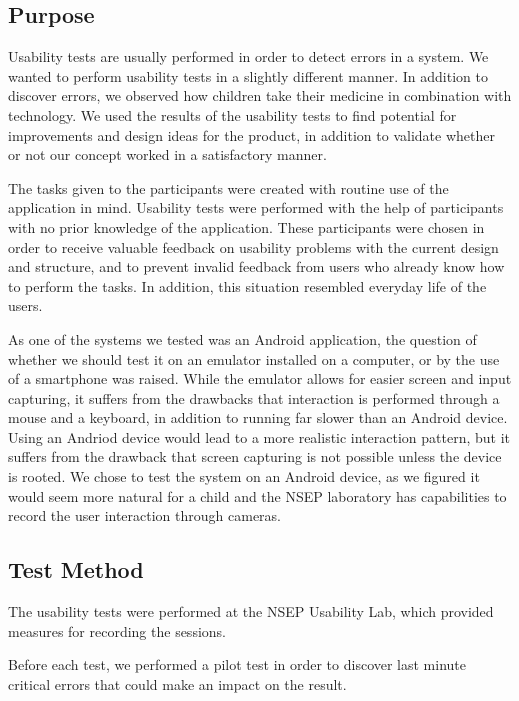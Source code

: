 \subsection{Purpose}
\label{sec:usabilitypurpose}
Usability tests are usually performed in order to detect errors in a system. We wanted to perform usability tests in a slightly different manner. In addition to discover errors, we observed how children take their medicine in combination with technology. We used the results of the usability tests to find potential for improvements and design ideas for the product, in addition to validate whether or not our concept worked in a satisfactory manner.
 
The tasks given to the participants were created with routine use of the application in mind. Usability tests were performed with the help of participants with no prior knowledge of the application. These participants were chosen in order to receive valuable feedback on usability problems with the current design and structure, and to prevent invalid feedback from users who already know how to perform the tasks. In addition, this situation resembled everyday life of the users.

As one of the systems we tested was an Android application, the question of whether we should test it on an emulator installed on a computer, or by the use of a smartphone was raised. While the emulator allows for easier screen and input capturing, it suffers from the drawbacks that interaction is performed through a mouse and a keyboard, in addition to running far slower than an Android device. Using an Andriod device would lead to a more realistic interaction pattern, but it suffers from the drawback that screen capturing is not possible unless the device is rooted. We chose to test the system on an Android device, as we figured it would seem more natural for a child and the NSEP laboratory has capabilities to record the user interaction through cameras.  


\subsection{Test Method}
\label{sec:testmethod}

The usability tests were performed at the NSEP Usability Lab, which provided measures for recording the sessions.  

Before each test, we performed a pilot test in order to discover last minute critical errors that could make an impact on the result.

